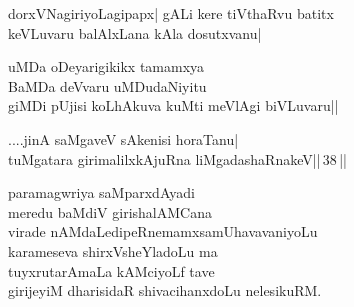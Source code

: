 \begin{entry}
\medskip

\begin{shl}
dorxVNagiriyoLagipapx| gALi kere tiVthaRvu batitx\\
keVLuvaru balAlxLana kAla dosutxvanu|
\end{shl}
\smallskip
{}
\end{entry}

\begin{entry}
\medskip

\begin{shl}
uMDa oDeyarigikikx tamamxya\\
BaMDa deVvaru uMDudaNiyitu\\
giMDi pUjisi koLhAkuva kuMti meVlAgi biVLuvaru||
\end{shl}
\medskip
{}
\smallskip
{}
\end{entry}

\begin{entry}
\medskip

\begin{shl}
....jinA saMgaveV sAkenisi horaTanu|\\
tuMgatara girimalilxkAjuRna liMgadashaRnakeV||\,38\,||
\end{shl}
\medskip
{}
\end{entry}

\begin{entry}
\medskip

\begin{shl}
paramagwriya saMparxdAyadi\\
meredu baMdiV girishalAMCana\\
virade nAMdaLedipeRnemamxsamUhavavaniyoLu\\
karameseva shirxVsheYladoLu ma\\
tuyxrutarAmaLa kAMciyoLf tave\\
girijeyiM dharisidaR shivacihanxdoLu nelesikuRM.
\end{shl}
\medskip
{}
\end{entry}

